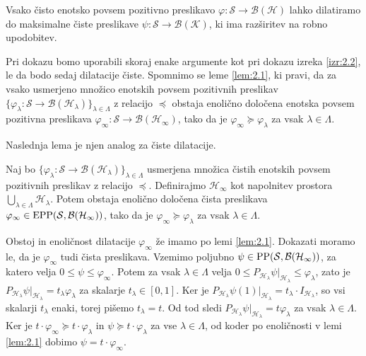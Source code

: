 \begin{izrek}\label{izr:3.1}
    Vsako čisto enotsko povsem pozitivno preslikavo $\varphi: \mathcal{S} \to \mathcal{B}(\mathcal{H})$ lahko dilatiramo do maksimalne čiste preslikave
    $\psi: \mathcal{S} \to \mathcal{B}(\mathcal{K})$, ki ima razširitev na robno upodobitev.
\end{izrek}

Pri dokazu bomo uporabili skoraj enake argumente kot pri dokazu izreka \ref{izr:2.2},
le da bodo sedaj dilatacije čiste. Spomnimo se leme \ref{lem:2.1}, ki pravi, da za vsako 
usmerjeno množico enotskih povsem pozitivnih preslikav $\{\varphi_{\lambda} : \mathcal{S} \to \mathcal{B} (\mathcal{H}_\lambda)\}_{\lambda \in \Lambda}$ 
z relacijo $\preceq$ obstaja enolično določena enotska povsem pozitivna preslikava $\varphi_{\infty}: \mathcal{S} \to \mathcal{B} (\mathcal{H}_\infty)$,
tako da je $\varphi_\infty \succeq \varphi_{\lambda}$ za vsak $\lambda \in \Lambda$. 

Naslednja lema je njen analog za čiste dilatacije.

\begin{lema}
    Naj bo $\{\varphi_{\lambda} : \mathcal{S} \to \mathcal{B} (\mathcal{H}_\lambda)\}_{\lambda \in \Lambda}$ 
    usmerjena množica čistih enotskih povsem pozitivnih preslikav z relacijo $\preceq$.
    Definirajmo $\mathcal{H}_\infty$ kot napolnitev prostora $\bigcup_{\lambda \in \Lambda} \mathcal{H}_\lambda$.
    Potem obstaja enolično določena čista preslikava $\varphi_{\infty} \in \operatorname{EPP} (\mathcal{S}, \mathcal{B} (\mathcal{H}_\infty))$,
    tako da je $\varphi_\infty \succeq \varphi_{\lambda}$ za vsak $\lambda \in \Lambda$. 
\end{lema}

\begin{dokaz}
    Obstoj in enoličnost dilatacije $\varphi_\infty$ že imamo po lemi \ref{lem:2.1}.
    Dokazati moramo le, da je $\varphi_\infty$ tudi čista preslikava.
    Vzemimo poljubno $\psi \in \operatorname{PP} (\mathcal{S}, \mathcal{B}(\mathcal{H}_\infty))$, 
    za katero velja $0 \leq \psi \leq \varphi_\infty$. Potem za vsak $\lambda \in \Lambda$ velja $0 \leq P_{\mathcal{H}_\lambda} \psi |_{\mathcal{H}_\lambda} \leq \varphi_\lambda$,
    zato je $P_{\mathcal{H}_\lambda} \psi |_{\mathcal{H}_\lambda} = t_\lambda \varphi_\lambda$ za skalarje $t_\lambda \in [0, 1]$.
    Ker je $P_{\mathcal{H}_\lambda} \psi(1) |_{\mathcal{H}_\lambda} = t_\lambda \cdot I_{\mathcal{H}_\lambda}$, so vsi skalarji $t_\lambda$ enaki, torej pišemo $t_\lambda = t$.
    Od tod sledi $P_{\mathcal{H}_\lambda} \psi |_{\mathcal{H}_\lambda} = t \varphi_\lambda$ za vsak $\lambda \in \Lambda$.
    Ker je $t \cdot \varphi_\infty \succeq t \cdot \varphi_\lambda$ in $\psi \succeq t \cdot \varphi_\lambda$ za vse $\lambda \in \Lambda$, od koder po enoličnosti v lemi \ref{lem:2.1}
    dobimo $\psi = t \cdot \varphi_\infty$. 
\end{dokaz}

